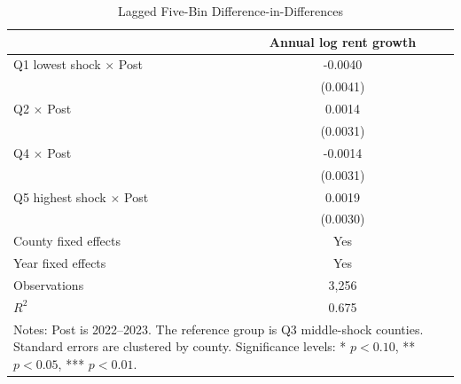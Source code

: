\begin{table}[!htbp]\centering
\caption{Lagged Five-Bin Difference-in-Differences}\label{tab:main_lagged_did}
\begin{tabular}{lc}\toprule
 & Annual log rent growth \\
\midrule
Q1 lowest shock $\times$ Post & -0.0040 \\
 & (0.0041) \\
Q2 $\times$ Post & 0.0014 \\
 & (0.0031) \\
Q4 $\times$ Post & -0.0014 \\
 & (0.0031) \\
Q5 highest shock $\times$ Post & 0.0019 \\
 & (0.0030) \\
\midrule
County fixed effects & Yes \\
Year fixed effects & Yes \\
Observations & 3,256 \\
$R^2$ & 0.675 \\
\bottomrule
\multicolumn{2}{p{0.76\textwidth}}{\footnotesize Notes: Post is 2022--2023. The reference group is Q3 middle-shock counties. Standard errors are clustered by county. Significance levels: * $p<0.10$, ** $p<0.05$, *** $p<0.01$.}
\end{tabular}
\end{table}
